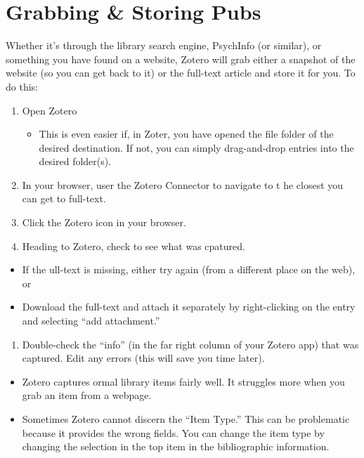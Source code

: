 \documentclass[
  english,
]{book}
\providecommand{\tightlist}{%
  \setlength{\itemsep}{0pt}\setlength{\parskip}{0pt}}
\begin{document}
\hypertarget{grabbing-storing-pubs}{%
\section{Grabbing \& Storing Pubs}\label{grabbing-storing-pubs}}

Whether it's through the library search engine, PsychInfo (or similar), or something you have found on a website, Zotero will grab either a snapshot of the website (so you can get back to it) or the full-text article and store it for you. To do this:

\begin{enumerate}
\def\labelenumi{\arabic{enumi}.}
\tightlist
\item
  Open Zotero

  \begin{itemize}
  \tightlist
  \item
    This is even easier if, in Zoter, you have opened the file folder of the desired destination. If not, you can simply drag-and-drop entries into the desired folder(s).
  \end{itemize}
\item
  In your browser, user the Zotero Connector to navigate to t he closest you can get to full-text.
\item
  Click the Zotero icon in your browser.
\item
  Heading to Zotero, check to see what was cpatured.
\end{enumerate}

\begin{itemize}
\tightlist
\item
  If the ull-text is missing, either try again (from a different place on the web), or
\item
  Download the full-text and attach it separately by right-clicking on the entry and selecting ``add attachment.''
\end{itemize}

\begin{enumerate}
\def\labelenumi{\arabic{enumi}.}
\setcounter{enumi}{4}
\tightlist
\item
  Double-check the ``info'' (in the far right column of your Zotero app) that was captured. Edit any errors (this will save you time later).
\end{enumerate}

\begin{itemize}
\tightlist
\item
  Zotero captures ormal library items fairly well. It struggles more when you grab an item from a webpage.
\item
  Sometimes Zotero cannot discern the ``Item Type.'' This can be problematic because it provides the wrong fields. You can change the item type by changing the selection in the top item in the bibliographic information.
\end{itemize}
\end{document}
